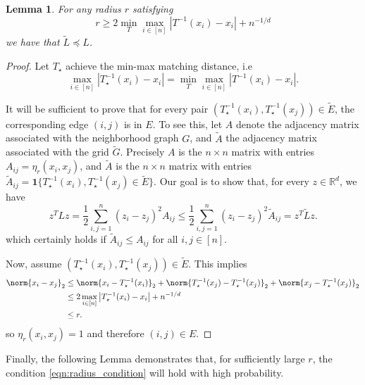 \documentclass{article}
\newcommand{\Reals}{\mathbb{R}}
\newcommand{\abs}[1]{\left \lvert #1 \right \rvert}
\newcommand{\1}{\mathbf{1}}
\newcommand{\Rd}{\Reals^d}
\newcommand{\wt}[1]{\widetilde{#1}}
\theoremstyle{alden}
\theoremstyle{aldenthm}
\newtheorem{lemma}{Lemma}
\theoremstyle{definition}
\theoremstyle{remark}
\begin{document}
\begin{lemma}
	\label{lem:partial_ordering_grid}
	For any radius $r$ satisfying
	\begin{equation}
	\label{eqn:radius_condition}
	r \geq 2 \min_{T} \max_{i \in [n]} \abs{T^{-1}(x_i) - x_i} + n^{-1/d}
	\end{equation}
	we have that $\wt{L} \preceq L$. 
\end{lemma}
\begin{proof}
	Let $T_{\star}$ achieve the min-max matching distance, i.e
	\begin{equation*}
	\max_{i \in [n]} \abs{T_{\star}^{-1}(x_i) - x_i} = \min_{T} \max_{i \in [n]} \abs{T^{-1}(x_i) - x_i}.
	\end{equation*}
	
	It will be sufficient to prove that for every pair $(T_{\star}^{-1}(x_i), T_{\star}^{-1}(x_j)) \in \wt{E}$, the corresponding edge $(i,j)$ is in $E$. To see this, let $A$ denote the adjacency matrix associated with the neighborhood graph $G$, and $\wt{A}$ the adjacency matrix associated with the grid $\wt{G}$. Precisely $A$ is the $n \times n$ matrix with entries $A_{ij} = \eta_r(x_i,x_j)$, and $\wt{A}$ is the $n \times n$ matrix with entries $\wt{A}_{ij} = \1\{T_{\star}^{-1}(x_i), T_{\star}^{-1}(x_j) \in \wt{E} \}$. Our goal is to show that, for every $z \in \Rd$, we have
	\begin{equation*}
	z^T L z = \frac{1}{2}\sum_{i, j = 1}^{n} (z_i - z_j)^2 A_{ij} \leq \frac{1}{2}\sum_{i, j = 1}^{n} (z_i - z_j)^2 \wt{A}_{ij} = z^T \wt{L} z.
	\end{equation*}
	which certainly holds if $\wt{A}_{ij} \leq A_{ij}$ for all $i,j \in [n]$.
	
	Now, assume $(T_{\star}^{-1}(x_i), T_{\star}^{-1}(x_j)) \in \wt{E}$. This implies
	\begin{align*}
	\norm{x_i - x_j}_2 & \leq \norm{x_i - T_{\star}^{-1}(x_i)}_2 + \norm{T_{\star}^{-1}(x_j) - T_{\star}^{-1}(x_j)}_2 + \norm{x_j - T_{\star}^{-1}(x_j)}_2 \\
	& \leq 2 \max_{i \in [n]} \abs{T_{\star}^{-1}(x_i) - x_i} + n^{-1/d} \\
	& \leq r.
	\end{align*}
	so $\eta_r(x_i,x_j) = 1$ and therefore $(i,j) \in E$. 
\end{proof}

Finally, the following Lemma demonstrates that, for sufficiently large $r$, the condition \eqref{eqn:radius_condition} will hold with high probability. 
\end{document}
